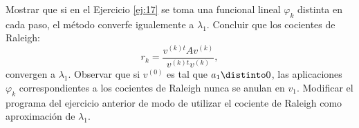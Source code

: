 \begin{enunciado}{\ejercicio}
  Mostrar que si en el Ejercicio \ref{ej:17} se toma una funcional lineal $\varphi_k$ distinta en
  cada paso, el método converfe igualemente a $\lambda_1$. Concluir que los cocientes de Raleigh:
  $$
    r_k = \frac{v^{(k)t} A v^{(k)}}{v^{(k)t} v^{(k)}},
  $$
  convergen a $\lambda_1$. Observar que si $v^{(0)}$ es tal que $a_1 \distinto 0$, las aplicaciones $\varphi_k$
  correspondientes a los cocientes de Raleigh nunca se anulan en $v_1$. Modificar el programa del ejercicio anterior de modo de utilizar el cociente
  de Raleigh como aproximación de $\lambda_1$.
\end{enunciado}

\hacer
